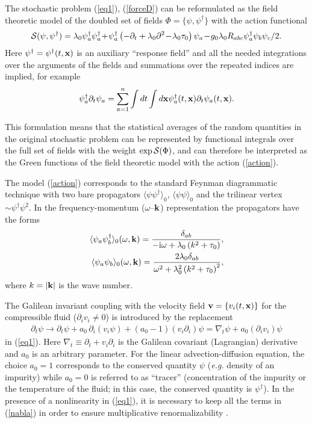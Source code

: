 \documentclass[12pt]{iopart}
\begin{document}
The stochastic problem (\ref{eq1}), (\ref{forceD}) can be
reformulated as the field theoretic model of the doubled set of fields
$\Phi = \{\psi,\psi^{\dag}\}$ with the action functional
\begin{eqnarray}
{\cal S} (\psi,\psi^{\dag}) =
\lambda_{0} \psi_{a}^{\dagger}\psi_{a}^{\dagger} \!+\!
\psi_{a}^{\dag} \left(-\partial_{t}+\lambda_{0} \partial^{2} \!-\!
\lambda_{0}\tau_{0}\right) \psi_{a} \!-\!
g_{0}\lambda_{0} R_{abc} \psi^{\dag}_{a}\psi_{b}\psi_{c}/2.
\label{action}
\end{eqnarray}
Here $\psi^{\dag}=\psi^{\dag}(t,{\bf x})$ is an auxiliary
``response field'' and all the needed integrations over the arguments of the
fields and summations over the repeated indices are implied, for example
\[  \psi_{a}^{\dag}\partial_{t}\psi_{a} = \sum_{a=1}^{n}
\int dt \int d{\bf x}
\psi_{a}^{\dag}(t,{\bf x})\partial_{t}\psi_{a}(t,{\bf x}). \]

This formulation means that the statistical averages of the random quantities
in the original stochastic problem can be represented by functional integrals
over the full set of fields with the weight $\exp {\cal S}(\Phi)$, and can
therefore be interpreted as the Green functions of the field theoretic model
with the action (\ref{action}).

The model (\ref{action}) corresponds to the standard Feynman
diagrammatic technique with two bare propagators
$\langle \psi \psi^{\dag} \rangle_{0}$, $\langle \psi \psi \rangle_{0}$
and the trilinear vertex $\sim \psi^{\dagger}\psi^2$. In the
frequency-momentum ($\omega$--${\bf k}$) representation the propagators
have the forms
\begin{eqnarray}
\langle \psi_{a} \psi_{b}^{\dag} \rangle_{0} (\omega,{\bf k}) =
\frac{\delta_{ab}}{-{\rm i}\omega+\lambda_{0} \left(k^{2}+\tau_{0}\right)},
\nonumber \\
\langle \psi_{a} \psi_{b} \rangle_{0}(\omega,{\bf k}) =
\frac{2\lambda_{0}\delta_{ab}}{\omega^2+\lambda_{0}^2
\left(k^{2}+\tau_{0}\right)^2},
\label{lines}
\end{eqnarray}
where $k=|{\bf k}|$ is the wave number.


The Galilean invariant coupling with the velocity field
${\bf v}= \{ v_{i}(t, {\bf x}) \}$ for the compressible fluid
($\partial _i v_{i} \ne 0$) is introduced by the replacement
\begin{eqnarray}
\partial_{t}\psi \to \partial_{t}\psi + a_{0}\, \partial_{i}(v_{i}\psi) +
(a_{0}-1) (v_{i} \partial_{i})\psi =
\nabla_{t} \psi + a_{0}(\partial_{i}v_{i}) \psi
\label{nabla}
\end{eqnarray}
in (\ref{eq1}). Here $\nabla_{t} \equiv \partial_{t} + v_{i} \partial_{i}$
is the Galilean covariant (Lagrangian) derivative and $a_{0}$ is an
arbitrary parameter. For the linear advection-diffusion equation, the
choice $a_{0}=1$ corresponds to the conserved quantity $\psi$ ({\it e.g.}
density of an impurity) while $a_{0}=0$ is referred to as ``tracer''
(concentration of the impurity or the temperature of the fluid; in this
case, the conserved quantity is $\psi^{\dag}$). In the presence of a
nonlinearity in (\ref{eq1}), it is necessary to keep all the terms in
(\ref{nabla}) in order to ensure multiplicative renormalizability \cite{AK}.
\end{document}
